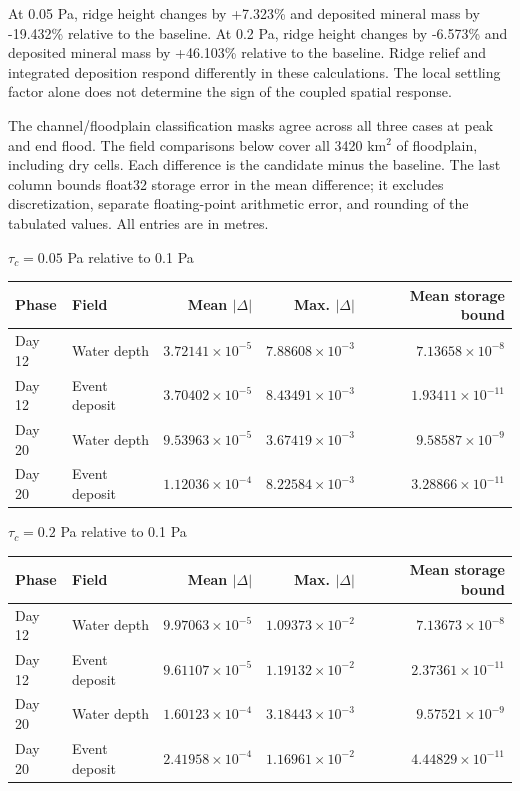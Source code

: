 At 0.05 Pa, ridge height changes by +7.323\% and deposited
mineral mass by -19.432\% relative to the baseline.
At 0.2 Pa, ridge height changes by -6.573\% and deposited
mineral mass by +46.103\% relative to the baseline.
Ridge relief and integrated deposition respond differently in these
calculations. The local settling factor alone does not determine the
sign of the coupled spatial response.

The channel/floodplain classification masks agree across all three
cases at peak and end flood. The field
comparisons below cover all 3420 km$^2$ of floodplain, including dry
cells. Each difference is the candidate minus the baseline. The
last column bounds float32 storage error in the mean difference;
it excludes discretization, separate floating-point arithmetic error,
and rounding of the tabulated values. All entries are in metres.

\begin{center}\small\setlength{\tabcolsep}{4pt}
$\tau_c=0.05$ Pa relative to 0.1 Pa\par\smallskip
\begin{tabular}{llrrr}
\toprule
Phase & Field & Mean $|\Delta|$ & Max. $|\Delta|$ & Mean storage bound \\
\midrule
Day 12 & Water depth & $3.72141\times10^{-5}$ & $7.88608\times10^{-3}$ & $7.13658\times10^{-8}$ \\
Day 12 & Event deposit & $3.70402\times10^{-5}$ & $8.43491\times10^{-3}$ & $1.93411\times10^{-11}$ \\
Day 20 & Water depth & $9.53963\times10^{-5}$ & $3.67419\times10^{-3}$ & $9.58587\times10^{-9}$ \\
Day 20 & Event deposit & $1.12036\times10^{-4}$ & $8.22584\times10^{-3}$ & $3.28866\times10^{-11}$ \\
\bottomrule\end{tabular}\end{center}

\begin{center}\small\setlength{\tabcolsep}{4pt}
$\tau_c=0.2$ Pa relative to 0.1 Pa\par\smallskip
\begin{tabular}{llrrr}
\toprule
Phase & Field & Mean $|\Delta|$ & Max. $|\Delta|$ & Mean storage bound \\
\midrule
Day 12 & Water depth & $9.97063\times10^{-5}$ & $1.09373\times10^{-2}$ & $7.13673\times10^{-8}$ \\
Day 12 & Event deposit & $9.61107\times10^{-5}$ & $1.19132\times10^{-2}$ & $2.37361\times10^{-11}$ \\
Day 20 & Water depth & $1.60123\times10^{-4}$ & $3.18443\times10^{-3}$ & $9.57521\times10^{-9}$ \\
Day 20 & Event deposit & $2.41958\times10^{-4}$ & $1.16961\times10^{-2}$ & $4.44829\times10^{-11}$ \\
\bottomrule\end{tabular}\end{center}

